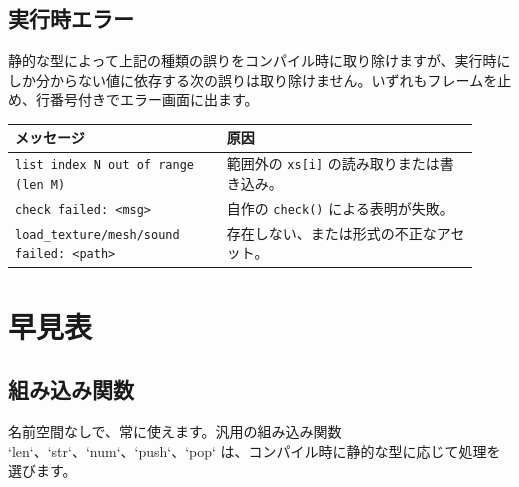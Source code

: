 \section*{実行時エラー}

静的な型によって上記の種類の誤りをコンパイル時に取り除けますが、実行時にしか分からない値に依存する次の誤りは取り除けません。いずれもフレームを止め、行番号付きでエラー画面に出ます。

\begin{center}
\begin{tabular}{@{}p{0.42\linewidth}p{0.50\linewidth}@{}}
\toprule
\textbf{メッセージ} & \textbf{原因} \\
\midrule
\texttt{list index N out of range (len M)} &
範囲外の \texttt{xs[i]} の読み取りまたは書き込み。 \\
\texttt{check failed: <msg>} &
自作の \texttt{check()} による表明が失敗。 \\
\texttt{load\_texture/mesh/sound failed: <path>} &
存在しない、または形式の不正なアセット。 \\
\bottomrule
\end{tabular}
\end{center}

\chapter{早見表}

\section*{組み込み関数}

名前空間なしで、常に使えます。汎用の組み込み関数 `len`、`str`、`num`、`push`、`pop` は、コンパイル時に静的な型に応じて処理を選びます。

